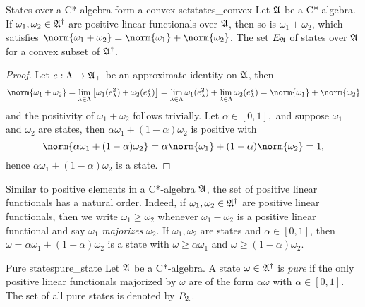 \begin{proposition}{States over a C*-algebra form a convex set}{states_convex}
    Let \(\mathfrak{A}\) be a C*-algebra. If \(\omega_1, \omega_2 \in \mathfrak{A}^\dag\) are positive linear functionals over \(\mathfrak{A}\), then so is \(\omega_1 + \omega_2\), which satisfies \(\norm{\omega_1 + \omega_2} = \norm{\omega_1} + \norm{\omega_2}\). The set \(E_{\mathfrak{A}}\) of states over \(\mathfrak{A}\) for a convex subset of \(\mathfrak{A}^\dag\).
\end{proposition}
\begin{proof}
    Let \(e : \Lambda \to \mathfrak{A}_+\) be an approximate identity on \(\mathfrak{A}\), then 
    \begin{equation*}
        \norm{\omega_1 + \omega_2} = \lim_{\lambda \in \Lambda}{\left[\omega_1(e_\lambda^2) + \omega_2(e_\lambda^2)\right]} = \lim_{\lambda \in \Lambda}{\omega_1(e_\lambda^2)} + \lim_{\lambda \in \Lambda}{\omega_2(e_\lambda^2)} = \norm{\omega_1} + \norm{\omega_2}
    \end{equation*}
    and the positivity of \(\omega_1 + \omega_2\) follows trivially. Let \(\alpha \in [0,1],\) and suppose \(\omega_1\) and \(\omega_2\) are states, then \(\alpha \omega_1 + (1 - \alpha) \omega_2\) is positive with
    \begin{equation*}
        \norm{\alpha \omega_1 + (1 - \alpha)\omega_2} = \alpha \norm{\omega_1} + (1 - \alpha) \norm{\omega_2} = 1,
    \end{equation*}
    hence \(\alpha \omega_1 + (1 - \alpha) \omega_2\) is a state.
\end{proof}

Similar to positive elements in a C*-algebra \(\mathfrak{A}\), the set of positive linear functionals has a natural order. Indeed, if \(\omega_1, \omega_2 \in \mathfrak{A}^\dag\) are positive linear functionals, then we write \(\omega_1 \geq \omega_2\) whenever \(\omega_1 - \omega_2\) is a positive linear functional and say \(\omega_1\) \emph{majorizes} \(\omega_2\). If \(\omega_1, \omega_2\) are states and \(\alpha \in [0,1]\), then \(\omega = \alpha \omega_1 + (1 - \alpha) \omega_2\) is a state with \(\omega \geq \alpha \omega_1\) and \(\omega \geq (1 - \alpha) \omega_2\).
\begin{definition}{Pure states}{pure_state}
    Let \(\mathfrak{A}\) be a C*-algebra. A state \(\omega \in \mathfrak{A}^\dag\) is \emph{pure} if the only positive linear functionals majorized by \(\omega\) are of the form \(\alpha \omega\) with \(\alpha \in [0,1]\). The set of all pure states is denoted by \(P_{\mathfrak{A}}\).
\end{definition}

